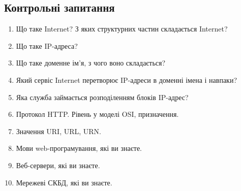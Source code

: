 \subsection*{Контрольні запитання}
\nopagebreak[4]
\begin{enumerate}
\item Що таке Internet? З яких структурних частин складається Internet?
\item Що таке IP-адреса?
\item Що таке доменне ім'я, з чого воно складається?
\item Який сервіс Internet перетворює IP-адреси в доменні імена і навпаки?
\item Яка служба займається розподіленням блоків IP-адрес?
\item Протокол HTTP. Рівень у моделі OSI, призначення.
\item Значення URI, URL, URN.
\item Мови web-програмування, які ви знаєте.
\item Веб-сервери, які ви знаєте.
\item Мережеві СКБД, які ви знаєте. 
\end{enumerate}



